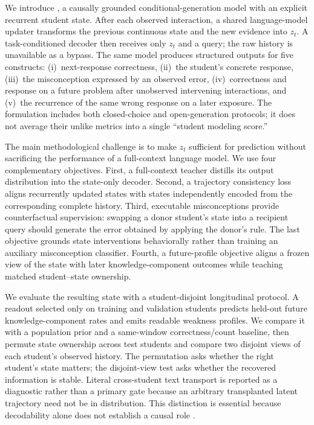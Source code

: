 We introduce \model, a causally grounded conditional-generation model with an
explicit recurrent student state.  After each observed interaction, a shared
language-model updater transforms the previous continuous state and the new
evidence into $z_t$.  A task-conditioned decoder then receives only $z_t$ and a
query; the raw history is unavailable as a bypass.  The same model produces
structured outputs for five constructs:
(i)~next-response correctness, (ii)~the student's concrete response,
(iii)~the misconception expressed by an observed error, (iv)~correctness and
response on a future problem after unobserved intervening interactions, and
(v)~the recurrence of the same wrong response on a later exposure.  The
formulation includes both closed-choice and open-generation protocols; it does
not average their unlike metrics into a single ``student modeling score.''

The main methodological challenge is to make $z_t$ sufficient for prediction
without sacrificing the performance of a full-context language model.  We use
four complementary objectives.  First, a full-context teacher distills its
output distribution into the state-only decoder.  Second, a trajectory
consistency loss aligns recurrently updated states with states independently
encoded from the corresponding complete history.  Third, executable
misconceptions provide counterfactual supervision: swapping a donor student's
state into a recipient query should generate the error obtained by applying the
donor's rule.  The last objective grounds state interventions behaviorally
rather than training an auxiliary misconception classifier.  Fourth, a
future-profile objective aligns a frozen view of the state with later
knowledge-component outcomes while teaching matched student--state ownership.

We evaluate the resulting state with a student-disjoint longitudinal protocol.
A readout selected only on training and validation students predicts held-out
future knowledge-component rates and emits readable weakness profiles.  We
compare it with a population prior and a same-window correctness/count
baseline, then permute state ownership across test students and compare two
disjoint views of each student's observed history.  The permutation asks
whether the right student's state matters; the disjoint-view test asks whether
the recovered information is stable.  Literal cross-student text transport is
reported as a diagnostic rather than a primary gate because an arbitrary
transplanted latent trajectory need not be in distribution.  This distinction
is essential because decodability alone does not establish a causal role
\citep{hewitt2019designing,elazar2021amnesic}.

